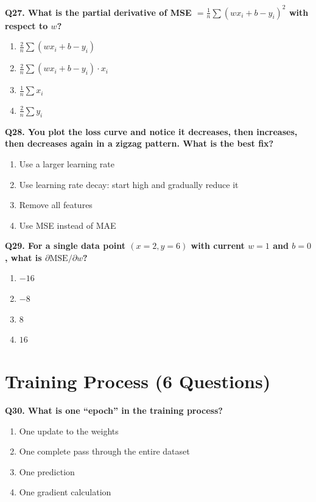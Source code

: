 \documentclass[12pt, a4paper]{article}
\newcommand{\question}[1]{\vspace{0.6em}\noindent\textbf{#1}}
\begin{document}
\question{Q27. What is the partial derivative of MSE $= \frac{1}{n}\sum(wx_i + b - y_i)^2$ with respect to $w$?}
\begin{enumerate}[label=\alph*)]
    \item $\frac{2}{n}\sum(wx_i + b - y_i)$
    \item $\frac{2}{n}\sum(wx_i + b - y_i) \cdot x_i$
    \item $\frac{1}{n}\sum x_i$
    \item $\frac{2}{n}\sum y_i$
\end{enumerate}

\question{Q28. You plot the loss curve and notice it decreases, then increases, then decreases again in a zigzag pattern. What is the best fix?}
\begin{enumerate}[label=\alph*)]
    \item Use a larger learning rate
    \item Use learning rate decay: start high and gradually reduce it
    \item Remove all features
    \item Use MSE instead of MAE
\end{enumerate}

\question{Q29. For a single data point $(x=2, y=6)$ with current $w=1$ and $b=0$, what is $\partial\text{MSE}/\partial w$?}
\begin{enumerate}[label=\alph*)]
    \item $-16$
    \item $-8$
    \item $8$
    \item $16$
\end{enumerate}

\section{Training Process (6 Questions)}

\question{Q30. What is one ``epoch'' in the training process?}
\begin{enumerate}[label=\alph*)]
    \item One update to the weights
    \item One complete pass through the entire dataset
    \item One prediction
    \item One gradient calculation
\end{enumerate}
\end{document}
